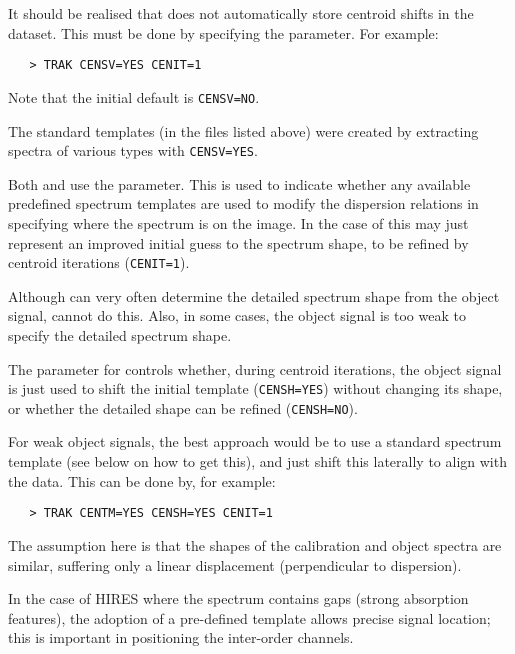 It should be realised that  does not
automatically store centroid shifts in the dataset.
This must be done by specifying the 
parameter. For example:

\begin{verbatim}
   > TRAK CENSV=YES CENIT=1
\end{verbatim}

Note that the initial default is \verb+CENSV=NO+\@.

The standard templates (in the files listed  above) were created by
extracting spectra of various types with \verb+CENSV=YES+\@.

Both  and 
use the  parameter.  This is used
to indicate whether any available predefined spectrum templates are used to
modify the dispersion relations in specifying where the spectrum is on the
image.  In the case of 
 this may just represent an improved initial
guess to the spectrum shape, to be refined by centroid iterations
(\verb+CENIT=1+)\@.

Although 
 can very often determine the detailed spectrum shape from
the object signal, 
 cannot do this.  Also, in some cases, the object
signal is too weak to specify the detailed spectrum shape.

The 
 parameter for 
 controls whether, during centroid
iterations, the object signal is just used to shift the initial template
(\verb+CENSH=YES+) without changing its shape, or whether the detailed shape
can be refined (\verb+CENSH=NO+)\@.

For weak object signals, the best approach would be to use a standard
spectrum template (see below on how to get this), and just shift this
laterally to align with the data.  This can be done by, for example:

\begin{verbatim}
   > TRAK CENTM=YES CENSH=YES CENIT=1
\end{verbatim}

The assumption here is that the shapes of the calibration and object
spectra are similar, suffering only a linear displacement (perpendicular to
dispersion)\@.

In the case of HIRES where the spectrum contains gaps (strong absorption
features), the adoption of a pre-defined template allows precise signal
location; this is important in positioning the inter-order channels.

